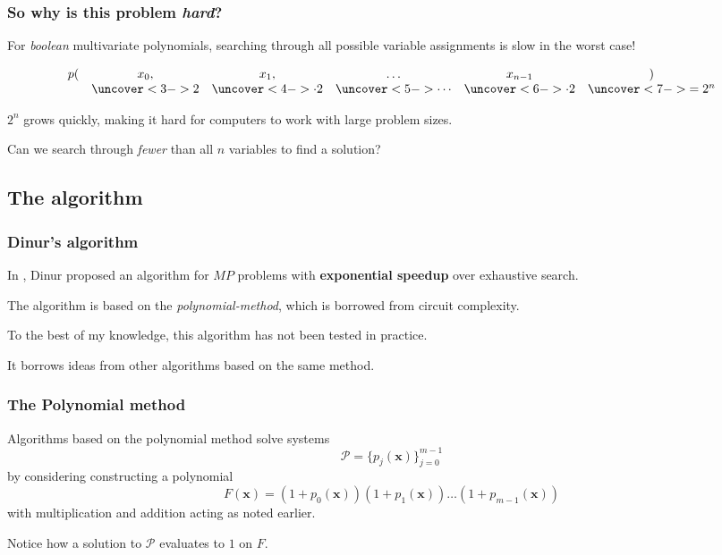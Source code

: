 \documentclass{beamer}
\begin{document}
\begin{frame}
    \frametitle{So why is this problem \textit{hard}?}
    For \textit{boolean} multivariate polynomials, searching through all possible variable assignments is slow in the worst case!

    \pause 

    \begin{equation*}
        \begin{array}{cccccc}
            p(  & x_0,  & x_1,      & \dots    & x_{n - 1}                  & )\\
                & \uncover<3->{2}     & \uncover<4->{\cdot 2}   & \uncover<5->{\cdots}  & \uncover<6->{\cdot 2}  & \uncover<7->{= 2^n}
        \end{array}
    \end{equation*}
    
    \pause[8]

    $2^n$ grows quickly, making it hard for computers to work with large problem sizes.

    \pause[9]

    Can we search through \textit{fewer} than all $n$ variables to find a solution?
\end{frame}

\subsection{The algorithm}
\begin{frame}
    \frametitle{Dinur's algorithm}
    In \cite{eurocrypt-2021-30841}, Dinur proposed an algorithm for $MP$ problems with \textbf{exponential speedup} over exhaustive search.

    The algorithm is based on the \textit{polynomial-method}, which is borrowed from circuit complexity.

    To the best of my knowledge, this algorithm has not been tested in practice.

    It borrows ideas from other algorithms based on the same method.
\end{frame}

\begin{frame}
    \frametitle{The Polynomial method}
    Algorithms based on the polynomial method solve systems 
    $$
        \mathcal{P} = \{p_j(\mathbf{x})\}^{m - 1}_{j = 0}
    $$ 
    by considering constructing a polynomial 
    $$
        F(\mathbf{x}) = (1 + p_0(\mathbf{x}))(1 + p_1(\mathbf{x})) \dots (1 + p_{m - 1}(\mathbf{x}))
    $$
    with multiplication and addition acting as noted earlier.

    Notice how a solution to $\mathcal{P}$ evaluates to $1$ on $F$.
\end{frame}
\end{document}
